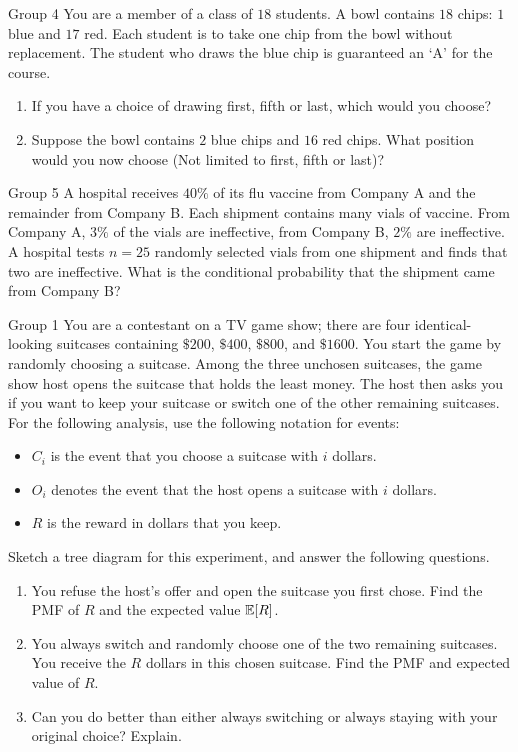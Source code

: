 \documentclass{article}
\begin{document}
\begin{problem}
    {Group 4}
    You are a member of a class of $18$ students. A bowl contains $18$ chips: $1$ blue and $17$ red. Each student is to take one chip from the bowl without replacement. The student who draws the blue chip is guaranteed an `A' for the course.
    \begin{enumerate}
        \item If you have a choice of drawing first, fifth or last, which would you choose?
        \item Suppose the bowl contains $2$ blue chips and $16$ red chips. What position would you now choose (Not limited to first, fifth or last)?
    \end{enumerate}
\end{problem}

\begin{problem}
    {Group 5}
    A hospital receives $40\%$ of its flu vaccine from Company A and the remainder from Company B. Each shipment contains many vials of vaccine. From Company A, $3\%$ of the vials are ineffective, from Company B, $2\%$ are ineffective. A hospital tests $n=25$ randomly selected vials from one shipment and finds that two are ineffective. What is the conditional probability that the shipment came from Company B?
\end{problem}
\fi
\iffalse
\begin{problem}
    {Group 1}
    You are a contestant on a TV game show; there are four identical-looking suitcases containing $\$200$, $\$400$, $\$800$, and $\$1600$. You start the game by randomly choosing a suitcase. Among the three unchosen suitcases, the game show host opens the suitcase that holds the least money. The host then asks you if you want to keep your suitcase or switch one of the other remaining suitcases. For the following analysis, use the following notation for events:
    \begin{itemize}
        \item $C_i$ is the event that you choose a suitcase with $i$ dollars.
        \item $O_i$ denotes the event that the host opens a suitcase with $i$ dollars.
        \item $R$ is the reward in dollars that you keep.
    \end{itemize}
    Sketch a tree diagram for this experiment, and answer the following questions.
    \begin{enumerate}
        \item You refuse the host’s offer and open the suitcase you first chose. Find the PMF of $R$ and the expected value $\E{R}$.
        \item You always switch and randomly choose one of the two remaining suitcases. You receive the $R$ dollars in this chosen suitcase. Find the PMF and expected value of $R$.
        \item Can you do better than either always switching or always staying with your original choice? Explain.
    \end{enumerate}
\end{problem}
\end{document}
